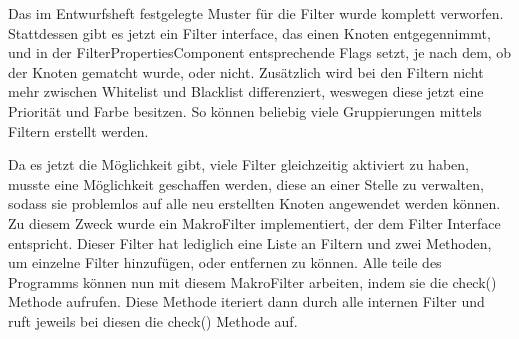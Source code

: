 Das im Entwurfsheft festgelegte Muster für die Filter wurde komplett verworfen. Stattdessen gibt es jetzt ein Filter interface, das einen Knoten entgegennimmt, und in der
FilterPropertiesComponent entsprechende Flags setzt, je nach dem, ob der Knoten gematcht wurde, oder nicht. Zusätzlich wird bei den Filtern nicht mehr zwischen Whitelist und
Blacklist differenziert, weswegen diese jetzt eine Priorität und Farbe besitzen. So können beliebig viele Gruppierungen mittels Filtern erstellt werden. \par
Da es jetzt die Möglichkeit gibt, viele Filter gleichzeitig aktiviert zu haben, musste eine Möglichkeit geschaffen werden, diese an einer Stelle zu verwalten, sodass sie problemlos
auf alle neu erstellten Knoten angewendet werden können. Zu diesem Zweck wurde ein MakroFilter implementiert, der dem Filter Interface entspricht. Dieser Filter hat lediglich eine
Liste an Filtern und zwei Methoden, um einzelne Filter hinzufügen, oder entfernen zu können. Alle teile des Programms können nun mit diesem MakroFilter arbeiten, indem sie die check()
Methode aufrufen. Diese Methode iteriert dann durch alle internen Filter und ruft jeweils bei diesen die check() Methode auf. 